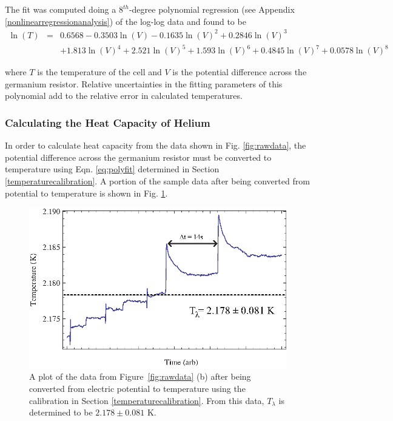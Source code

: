The fit was computed doing a $8^{th}$-degree polynomial regression (see Appendix \ref{nonlinearregressionanalysis}) of the log-log data and found to be 
\begin{eqnarray}\label{eq:polyfit}
\ln(T) &=& 0.6568 - 0.3503\ln(V) - 0.1635\ln(V)^{2} + 0.2846\ln(V)^{3} \\
& & + 1.813\ln(V)^{4} + 2.521\ln(V)^{5} + 1.593\ln(V)^{6} + 0.4845\ln(V)^{7} + 0.0578\ln(V)^{8} \nonumber
\end{eqnarray}

where $T$ is the temperature of the cell and $V$ is the potential difference across the germanium resistor.  Relative uncertainties in the fitting parameters of this polynomial add to the relative error in calculated temperatures.   

\subsubsection{Calculating the Heat Capacity of Helium}\label{calculatingtheheatcapacityofthecell}

In order to calculate heat capacity from the data shown in Fig. \ref{fig:rawdata}, the potential difference across the germanium resistor must be converted to temperature using Eqn. \ref{eq:polyfit} determined in Section \ref{temperaturecalibration}. A portion of the sample data after being converted from potential to temperature is shown in Fig. \ref{fig:heatingdata}.  
\begin{figure}[htbp]
\begin{center}
\includegraphics[height=70mm]{./figures/heatingdata.eps}
\caption{\small{A plot of the data from Figure~\ref{fig:rawdata} (b) after being converted from electric potential to temperature using the calibration in Section \ref{temperaturecalibration}.  From this data, $T_{\lambda}$ is determined to be $2.178\pm0.081$ K.}}
\label{fig:heatingdata}
\end{center}
\end{figure}

